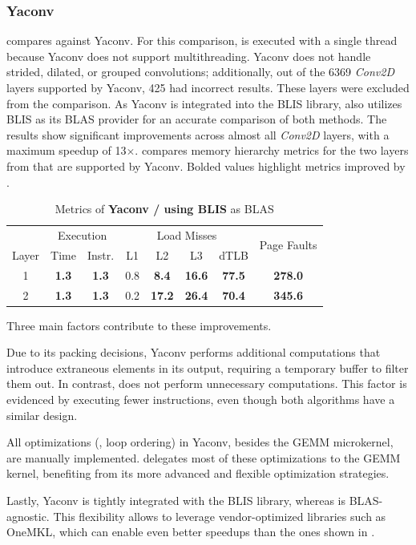 \subsubsection{Yaconv}
\label{sec:eval:yaconv}

 compares \algname against Yaconv.
For this comparison, \algname is executed with a single thread because Yaconv does not support multithreading.
Yaconv does not handle strided, dilated, or grouped convolutions; additionally, out of the 6369 \emph{Conv2D} layers supported by Yaconv, 425 had incorrect results.
These layers were excluded from the comparison.
As Yaconv is integrated into the BLIS library, \algname also utilizes BLIS as its BLAS provider for an accurate comparison of both methods.
The results show significant improvements across almost all \emph{Conv2D} layers, with a maximum speedup of 13$\times$.
 compares memory hierarchy metrics for the two layers from  that are supported by Yaconv.
Bolded values highlight metrics improved by \algname.

\begin{table}[t]
    \caption{Metrics of \textbf{Yaconv / \algname using BLIS} as BLAS}
    \label{tab:yaconv-perf}
    \small
    \setlength{\tabcolsep}{4pt} %
    \centering
    \begin{tabular}{c|cc|cccc|c}
        & \multicolumn{2}{c|}{Execution} & \multicolumn{4}{c|}{Load Misses} & \multirow{2}{*}{Page Faults} \\
        Layer & Time & Instr. & L1 & L2 & L3 & dTLB & \\ \hline
        1 & \textbf{1.3} & \textbf{1.3} & 0.8 & \textbf{8.4} & \textbf{16.6} & \textbf{77.5} & \textbf{278.0} \\
        2 & \textbf{1.3} & \textbf{1.3} & 0.2 & \textbf{17.2} & \textbf{26.4} & \textbf{70.4} & \textbf{345.6} \\
    \end{tabular}
\end{table}

Three main factors contribute to these improvements.
\begin{enumerate*}[label=(\arabic*)]
\item Due to its packing decisions, Yaconv performs additional computations that introduce extraneous elements in its output, requiring a temporary buffer to filter them out.
In contrast, \algname does not perform unnecessary computations.
This factor is evidenced by \algname executing fewer instructions, even though both algorithms have a similar design.
%
\item All optimizations (\eg, loop ordering) in Yaconv, besides the GEMM microkernel, are manually implemented.
\algname delegates most of these optimizations to the GEMM kernel, benefiting from its more advanced and flexible optimization strategies.
%
\item Lastly, Yaconv is tightly integrated with the BLIS library, whereas \algname is BLAS-agnostic. 
This flexibility allows \algname to leverage vendor-optimized libraries such as OneMKL, which can enable even better speedups than the ones shown in .
\end{enumerate*}

